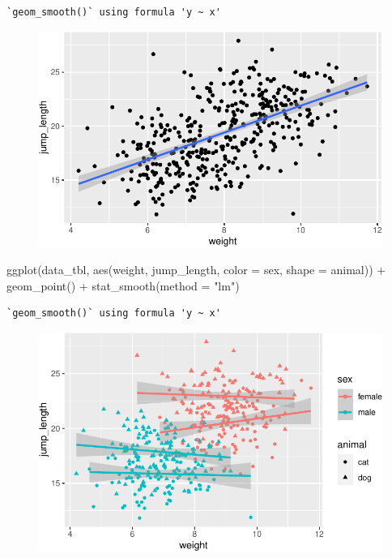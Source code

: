 \documentclass[
  letterpaper,
  DIV=11,
  oneside]{scrreport}
\newenvironment{Shaded}{\begin{snugshade}}{\end{snugshade}}
\newcommand{\AttributeTok}[1]{\textcolor[rgb]{0.40,0.45,0.13}{#1}}
\newcommand{\FunctionTok}[1]{\textcolor[rgb]{0.28,0.35,0.67}{#1}}
\newcommand{\NormalTok}[1]{\textcolor[rgb]{0.00,0.23,0.31}{#1}}
\newcommand{\SpecialCharTok}[1]{\textcolor[rgb]{0.37,0.37,0.37}{#1}}
\newcommand{\StringTok}[1]{\textcolor[rgb]{0.13,0.47,0.30}{#1}}
\begin{document}
\begin{verbatim}
`geom_smooth()` using formula 'y ~ x'
\end{verbatim}

\begin{figure}[H]

{\centering \includegraphics{./stat-modeling-gaussian_files/figure-pdf/unnamed-chunk-3-1.pdf}

}

\end{figure}

\begin{Shaded}
\begin{Highlighting}[]
\FunctionTok{ggplot}\NormalTok{(data\_tbl, }\FunctionTok{aes}\NormalTok{(weight, jump\_length, }\AttributeTok{color =}\NormalTok{ sex, }\AttributeTok{shape =}\NormalTok{ animal)) }\SpecialCharTok{+}
  \FunctionTok{geom\_point}\NormalTok{() }\SpecialCharTok{+}
  \FunctionTok{stat\_smooth}\NormalTok{(}\AttributeTok{method =} \StringTok{"lm"}\NormalTok{)}
\end{Highlighting}
\end{Shaded}

\begin{verbatim}
`geom_smooth()` using formula 'y ~ x'
\end{verbatim}

\begin{figure}[H]

{\centering \includegraphics{./stat-modeling-gaussian_files/figure-pdf/unnamed-chunk-3-2.pdf}

}

\end{figure}
\end{document}
